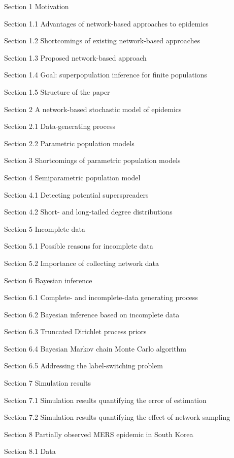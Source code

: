 \bi
\item[] Section 1 Motivation
\bi
\item[] Section 1.1 Advantages of network-based approaches to epidemics
\item[] Section 1.2 Shortcomings of existing network-based approaches
\item[] Section 1.3 Proposed network-based approach 
\item[] Section 1.4 Goal: superpopulation inference for finite populations
\item[] Section 1.5 Structure of the paper
\ei
\item[] Section 2 A network-based stochastic model of epidemics
\bi
\item[] Section 2.1 Data-generating process
\item[] Section 2.2 Parametric population models
\ei
\item[] Section 3 Shortcomings of parametric population models
\item[] Section 4 Semiparametric population model
\bi
\item[] Section 4.1 Detecting potential superspreaders
\item[] Section 4.2 Short- and long-tailed degree distributions
\ei
\item[] Section 5 Incomplete data
\bi
\item[] Section 5.1 Possible reasons for incomplete data
\item[] Section 5.2 Importance of collecting network data
\ei
\item[] Section 6 Bayesian inference
\bi
\item[] Section 6.1 Complete- and incomplete-data generating process
\item[] Section 6.2 Bayesian inference based on incomplete data
\item[] Section 6.3 Truncated Dirichlet process priors
\item[] Section 6.4 Bayesian Markov chain Monte Carlo algorithm
\item[] Section 6.5 Addressing the label-switching problem
\ei
\item[] Section 7 Simulation results
\bi
\item[] Section 7.1 Simulation results quantifying the error of estimation
\item[] Section 7.2 Simulation results quantifying the effect of network sampling
\ei
\item[] Section 8 Partially observed MERS epidemic in South Korea
\bi
\item[] Section 8.1 Data
